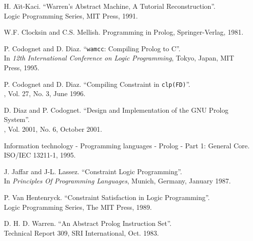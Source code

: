 \newpage


\begin{thebibliography}{99}

 H. A\"{\i}t-Kaci.
\newblock ``Warren's Abstract Machine, A Tutorial Reconstruction''. \\
\newblock Logic Programming Series, MIT Press, 1991. \\
\newblock {}

 W.F. Clocksin and C.S. Mellish.
\newblock Programming in Prolog, Springer-Verlag, 1981.

 P. Codognet and D. Diaz.
\newblock ``{\tt wamcc}: Compiling Prolog to C''.\\
\newblock In {\em 12th International Conference on Logic Programming},
Tokyo, Japan, MIT Press, 1995. \\
\newblock {}


 P. Codognet and D. Diaz.
\newblock ``Compiling Constraint in {\tt clp(FD)}''. \\
, Vol. 27, No. 3, June 1996. \\
\newblock {}

 D. Diaz and P. Codognet.
\newblock ``Design and Implementation of the GNU Prolog System''. \\
, Vol. 2001, No. 6, October 2001. \\
\newblock {}

\newblock Information technology - Programming languages - Prolog - Part 1:
General Core. \\
\newblock ISO/IEC 13211-1, 1995.

 J. Jaffar and J-L. Lassez.
\newblock ``Constraint Logic Programming''. \\
\newblock In {\em Principles Of Programming Languages},
Munich, Germany, January 1987.

 P. Van Hentenryck.
\newblock ``Constraint Satisfaction in Logic Programming''. \\
\newblock Logic Programming Series, The MIT Press, 1989.

 D. H. D. Warren.
\newblock ``An Abstract Prolog Instruction Set''. \\
\newblock Technical Report 309, SRI International, Oct. 1983.

\end{thebibliography}
